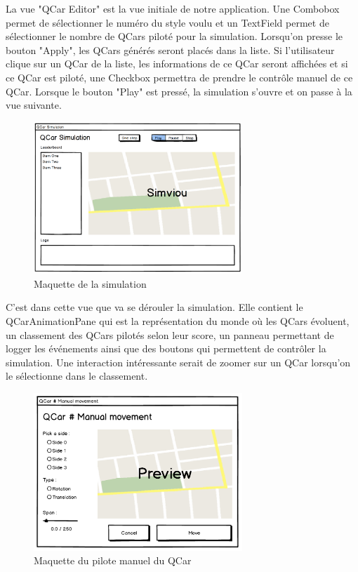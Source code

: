 \documentclass[a4paper, 12pt]{article}
\begin{document}
La vue "QCar Editor" est la vue initiale de notre application. Une Combobox permet de sélectionner le numéro du style voulu et un TextField permet de sélectionner le nombre de QCars piloté pour la simulation. Lorsqu'on presse le bouton "Apply", les QCars générés seront placés dans la liste. Si l'utilisateur clique sur un QCar de la liste, les informations de ce QCar seront affichées et si ce QCar est piloté, une Checkbox permettra de prendre le contrôle manuel de ce QCar. Lorsque le bouton "Play" est pressé, la simulation s'ouvre et on passe à la vue suivante.
\begin{figure}[H]
 \centering
 \includegraphics[width=0.7\textwidth]{includes/images/mockupsim}
 \caption{\label{fig:maquette_simulation}Maquette de la simulation}
\end{figure}
C'est dans cette vue que va se dérouler la simulation. Elle contient le QCarAnimationPane qui est la représentation du monde où les QCars évoluent, un classement des QCars pilotés selon leur score, un panneau permettant de logger les événements ainsi que des boutons qui permettent de contrôler la simulation. Une interaction intéressante serait de zoomer sur un QCar lorsqu'on le sélectionne dans le classement.
\begin{figure}[H]
 \centering
 \includegraphics[width=0.7\textwidth]{includes/images/mockupcontrol}
 \caption{\label{fig:maquette_controle}Maquette du pilote manuel du QCar}
\end{figure}
\end{document}
